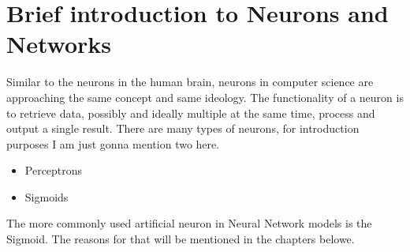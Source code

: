 
\section{Brief introduction to Neurons and Networks}
Similar to the neurons in the human brain, neurons in computer science are approaching the same concept and same ideology. 
\newline
The functionality of a neuron is to retrieve data, possibly and ideally multiple at the same time, process and output a single result. There
are many types of neurons, for introduction purposes I am just gonna mention two here.
\begin{itemize}
    \item Perceptrons
    \item Sigmoids
\end{itemize}
The more commonly used artificial neuron in Neural Network models is the Sigmoid. The reasons for that will be mentioned in the chapters
belowe.

